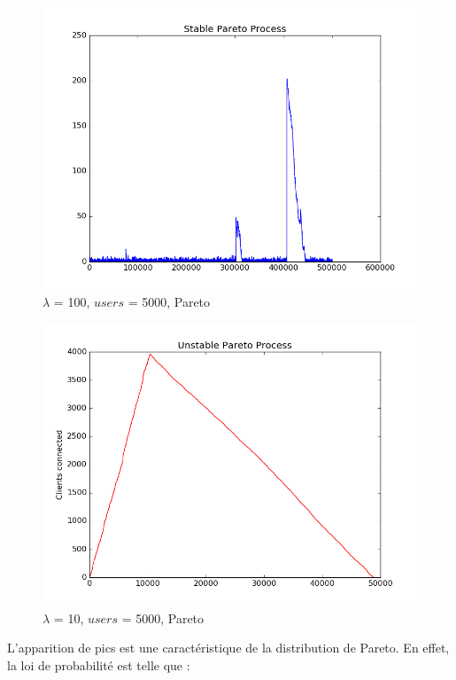 \documentclass[12pt]{article}
\begin{document}
\begin{figure}[H]
\centering
\includegraphics[scale=0.50]{stableprocessquestion3pareto.png}
\caption{\label{fig:rf_taille_noeud} $\lambda$ = 100, $users$ = 5000, Pareto}
\end{figure}

\begin{figure}[H]
\centering
\includegraphics[scale=0.50]{unstablepareto.png}
\caption{\label{fig:rf_taille_noeud} $\lambda$ = 10, $users$ = 5000, Pareto}
\end{figure}

L'apparition de pics est une caractéristique de la distribution de Pareto. En effet, la loi de probabilité est telle que :
\end{document}
